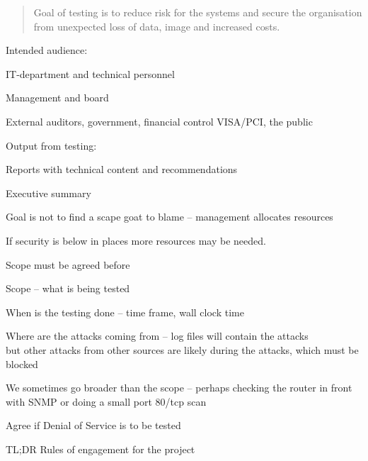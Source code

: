 \documentclass[Screen16to9,17pt]{foils}
\begin{document}

\begin{quote}
Goal of testing is to reduce risk for the systems and secure the organisation\\ from unexpected loss of data, image and increased costs.
\end{quote}

\begin{list1}
\item Intended audience:
\begin{list2}
\item IT-department and technical personnel
\item Management and board
\item External auditors, government, financial control VISA/PCI, the public
\end{list2}
\item Output from testing:
\begin{list2}
\item Reports with technical content and recommendations
\item Executive summary
\end{list2}
\end{list1}

Goal is not to find a scape goat to blame -- management allocates resources

If security is below in places more resources may be needed.



\begin{list1}
\item Scope must be agreed before
\begin{list2}
\item Scope -- what is being tested
\item When is the testing done -- time frame, wall clock time
\item Where are the attacks coming from -- log files will contain the attacks\\
but other attacks from other sources are likely during the attacks, which must be blocked
\item We sometimes go broader than the scope -- perhaps checking the router in front with SNMP or doing a small port 80/tcp scan
\item Agree if Denial of Service is to be tested
\item TL;DR Rules of engagement for the project
\end{list2}
\end{list1}
\end{document}
